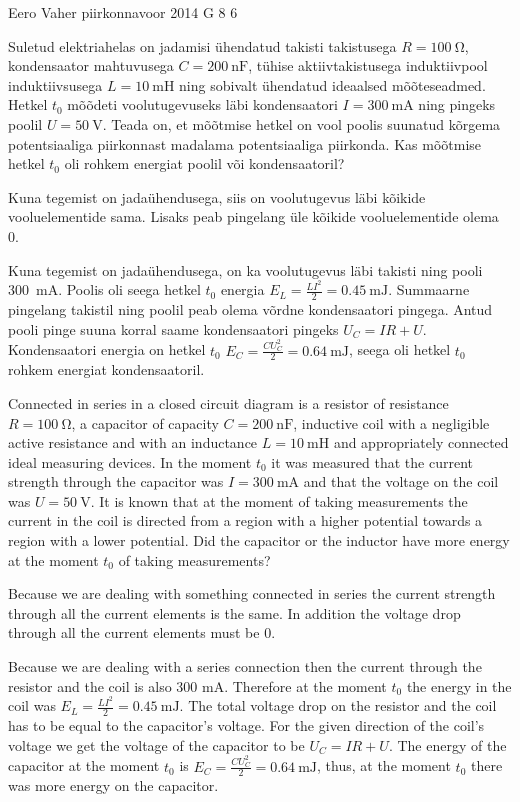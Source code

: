 {Eero Vaher} %
{piirkonnavoor} %
{2014} %
{G 8} %
{6} %
{
\ifStatement
Suletud elektriahelas on jadamisi ühendatud takisti takistusega $R=\SI{100}{\ohm}$, kondensaator mahtuvusega $C=\SI{200}{\nano\farad}$, tühise aktiivtakistusega induktiivpool induktiivsusega $L=\SI{10}{\milli\henry}$ ning sobivalt ühendatud ideaalsed mõõteseadmed. Hetkel $t_0$ mõõdeti voolutugevuseks läbi kondensaatori $I=\SI{300}{\milli\ampere}$ ning pingeks poolil $U=\SI{50}{\volt}$. Teada on, et mõõtmise hetkel on vool poolis suunatud kõrgema potentsiaaliga piirkonnast madalama potentsiaaliga piirkonda. Kas mõõtmise hetkel $t_0$ oli rohkem energiat poolil või kondensaatoril? 
\fi


\ifHint
Kuna tegemist on jadaühendusega, siis on voolutugevus läbi kõikide vooluelementide sama. Lisaks peab pingelang üle kõikide vooluelementide olema \num{0}.
\fi


\ifSolution
Kuna tegemist on jadaühendusega, on ka voolutugevus läbi takisti ning pooli \SI{300}{\milli\ampere}. Poolis oli seega hetkel $t_0$ energia $E_L=\frac{LI^2}{2}=\SI{0.45}{\milli\joule}$. Summaarne pingelang takistil ning poolil peab olema võrdne kondensaatori pingega. Antud pooli pinge suuna korral saame kondensaatori pingeks $U_C=IR+U$. Kondensaatori energia on hetkel $t_0$ $E_C=\frac{CU_C^2}{2}=\SI{0.64}{\milli\joule}$, seega oli hetkel $t_0$ rohkem energiat kondensaatoril. 
\fi


\ifEngStatement
Connected in series in a closed circuit diagram is a resistor of resistance $R=\SI{100}{\ohm}$, a capacitor of capacity $C=\SI{200}{\nano\farad}$, inductive coil with a negligible active resistance and with an inductance $L=\SI{10}{\milli\henry}$ and appropriately connected ideal measuring devices. In the moment $t_0$ it was measured that the current strength through the capacitor was $I=\SI{300}{\milli\ampere}$ and that the voltage on the coil was $U=\SI{50}{\volt}$. It is known that at the moment of taking measurements the current in the coil is directed from a region with a higher potential towards a region with a lower potential. Did the capacitor or the inductor have more energy at the moment $t_0$ of taking measurements?
\fi


\ifEngHint
Because we are dealing with something connected in series the current strength through all the current elements is the same. In addition the voltage drop through all the current elements must be 0.
\fi


\ifEngSolution
Because we are dealing with a series connection then the current through the resistor and the coil is also 300 mA. Therefore at the moment $t_0$ the energy in the coil was $E_L=\frac{LI^2}{2}=\SI{0.45}{\milli\joule}$. The total voltage drop on the resistor and the coil has to be equal to the capacitor’s voltage. For the given direction of the coil’s voltage we get the voltage of the capacitor to be $U_C=IR+U$. The energy of the capacitor at the moment $t_0$ is $E_C=\frac{CU_C^2}{2}=\SI{0.64}{\milli\joule}$, thus, at the moment $t_0$ there was more energy on the capacitor.
\fi
}